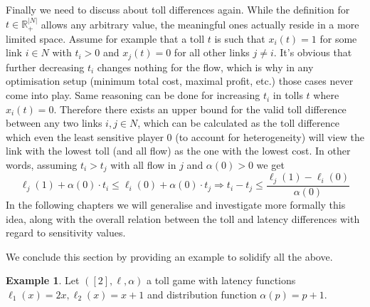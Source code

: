\documentclass[10pt,a4paper]{book}
\newcommand{\R}{\mathbb{R}}
\theoremstyle{definition}
\theoremstyle{comment}
\newtheorem{example}[definition]{Example}
\begin{document}
Finally we need to discuss about toll differences again.
While the definition for $t \in \R_+^{|N|}$ allows any arbitrary value, the meaningful ones actually reside in a more limited space.
Assume for example that a toll $t$ is such that $x_i(t) = 1$ for some link $i \in N$ with $t_i > 0$ and $x_j(t) = 0$ for all other links $j \ne i$.
It's obvious that further decreasing $t_i$ changes nothing for the flow, which is why in any optimisation setup (minimum total cost, maximal profit, etc.) those cases never come into play. Same reasoning can be done for increasing $t_i$ in tolls $t$ where $x_i(t) = 0$.
Therefore there exists an upper bound for the valid toll difference between any two links $i, j \in N$, which can be calculated as the toll difference which even the least sensitive player $0$ (to account for heterogeneity) will view the link with the lowest toll (and all flow) as the one with the lowest cost.
In other words, assuming $t_i > t_j$ with all flow in $j$ and $\alpha(0) > 0$ we get
\[\ell_j(1) + \alpha(0) \cdot t_i \le \ell_i(0) + \alpha(0) \cdot t_j \Rightarrow t_i - t_j \le \frac{\ell_j(1) - \ell_i(0)}{\alpha(0)}\]
In the following chapters we will generalise and investigate more formally this idea, along with the overall relation between the toll and latency differences with regard to sensitivity values.

We conclude this section by providing an example to solidify all the above.

\begin{example}
	\label{example:simple_alpha}
	Let $([2], \ell, \alpha)$ a toll game with latency functions $\ell_1(x) = 2x, \ell_2(x) = x + 1$ and distribution function $\alpha(p) = p + 1$.
\end{example}
\end{document}
